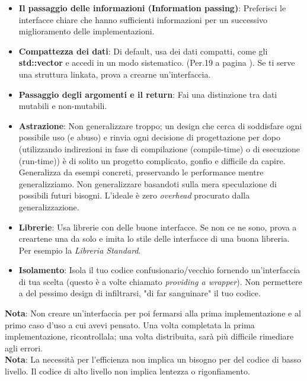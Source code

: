 \begin{itemize}
	\item \textsf{\small \textbf{Il passaggio delle informazioni (Information passing)}: Preferisci le interfacce chiare che hanno sufficienti informazioni per un successivo miglioramento delle implementazioni.}
	\item \textsf{\small \textbf{Compattezza dei dati}: Di default, usa dei dati compatti, come gli \textbf{std::vector} e accedi in un modo sistematico. (Per.19 a pagina \pageref{Per_19}). Se ti serve una struttura linkata, prova a crearne un'interfaccia.} %
	\item \textsf{\small \textbf{Passaggio degli argomenti e il return}: Fai una distinzione tra dati mutabili e non-mutabili.}
	\item \textsf{\small \textbf{Astrazione}: Non generalizzare troppo; un design che cerca di soddisfare ogni possibile uso (e abuso) e rinvia ogni decisione di progettazione per dopo (utilizzando indirezioni in fase di compilazione (compile-time) o di esecuzione (run-time)) è di solito un progetto complicato, gonfio e difficile da capire. Generalizza da esempi concreti, preservando le performance mentre generalizziamo. Non generalizzare basandoti sulla mera speculazione di possibili futuri bisogni. L'ideale è zero \emph{overhead} procurato dalla generalizzazione. }
	\item \textsf{\small \textbf{Librerie}: Usa librerie con delle buone interfacce. Se non ce ne sono, prova a creartene una da solo e imita lo stile delle interfacce di una buona libreria. Per esempio la \emph{Libreria Standard}.}
	\item \textsf{\small \textbf{Isolamento}: Isola il tuo codice confusionario/vecchio fornendo un'interfaccia di tua scelta (questo è a volte chiamato \emph{providing a wrapper}). Non permettere a del pessimo design di infiltrarsi, "di far sanguinare" il tuo codice.}
\end{itemize}

\textsf{\small \textbf{Nota}: Non creare un'interfaccia per poi fermarsi alla prima implementazione e al primo caso d'uso a cui avevi pensato. Una volta completata la prima implementazione, ricontrollala; una volta distribuita, sarà più difficile rimediare agli errori. } \\

\textsf{\small \textbf{Nota}: La necessità per l'efficienza non implica un bisogno per del codice di basso livello. Il codice di alto livello non implica lentezza o rigonfiamento.} \\

